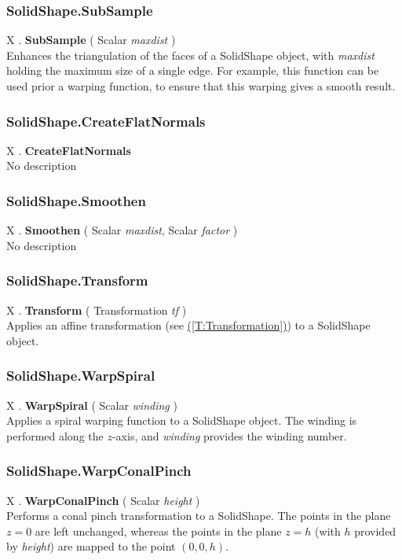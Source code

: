 \documentclass[10pt]{book}
\newcommand{\linkitem}[1]{\hyperref[#1]{\nameref{#1} (\ref{#1})}}
\newcommand{\var}[1]{\textit{#1}}
\begin{document}
\subsubsection{SolidShape.SubSample \label{F:SolidShape:SubSample}}
X . \textbf{SubSample} ( Scalar \textit{maxdist} ) \\
Enhances the triangulation of the faces of a SolidShape object, with \var{maxdist} holding the maximum size of a single edge. For example, this function can be used prior a warping function, to ensure that this warping gives a smooth result.

\subsubsection{SolidShape.CreateFlatNormals \label{F:SolidShape:CreateFlatNormals}}
X . \textbf{CreateFlatNormals} \\
No description

\subsubsection{SolidShape.Smoothen \label{F:SolidShape:Smoothen}}
X . \textbf{Smoothen} ( Scalar \textit{maxdist}, Scalar \textit{factor} ) \\
No description

\subsubsection{SolidShape.Transform \label{F:SolidShape:Transform}}
X . \textbf{Transform} ( Transformation \textit{tf} ) \\
Applies an affine transformation (see \linkitem{T:Transformation}) to a SolidShape object.

\subsubsection{SolidShape.WarpSpiral \label{F:SolidShape:WarpSpiral}}
X . \textbf{WarpSpiral} ( Scalar \textit{winding} ) \\
Applies a spiral warping function to a SolidShape object. The winding is performed along the $z$-axis, and \var{winding} provides the winding number.

\subsubsection{SolidShape.WarpConalPinch \label{F:SolidShape:WarpConalPinch}}
X . \textbf{WarpConalPinch} ( Scalar \textit{height} ) \\
Performs a conal pinch transformation to a SolidShape. The points in the plane $z=0$ are left unchanged, whereas the points in the plane $z=h$ (with $h$ provided by \var{height}) are mapped to the point $(0,0,h)$.
\end{document}
